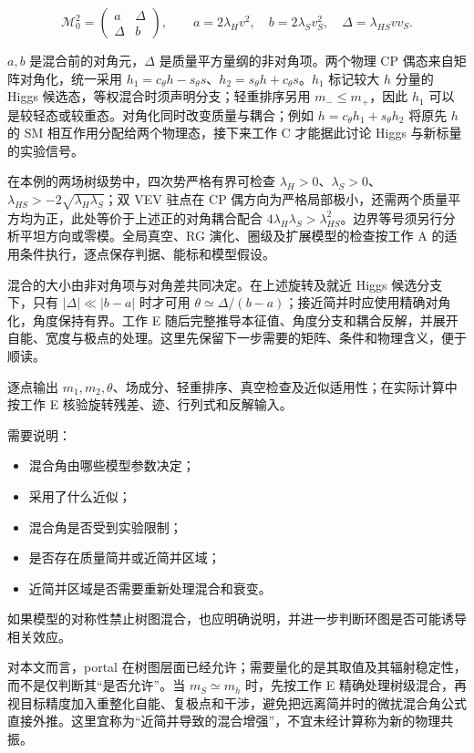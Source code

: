 \documentclass[
  chinese,
  UTF8]{ctexart}
\providecommand{\tightlist}{%
  \setlength{\itemsep}{0pt}\setlength{\parskip}{0pt}}
\begin{document}
\[
\mathcal M_0^2=
\begin{pmatrix}a&\Delta\\\Delta&b\end{pmatrix},\qquad
a=2\lambda_Hv^2,\quad b=2\lambda_Sv_S^2,\quad
\Delta=\lambda_{HS}vv_S.
\]

\(a,b\) 是混合前的对角元，\(\Delta\) 是质量平方量纲的非对角项。两个物理
CP 偶态来自矩阵对角化，统一采用
\(h_1=c_\theta h-s_\theta s\)、\(h_2=s_\theta h+c_\theta s\)。\(h_1\)
标记较大 \(h\) 分量的 Higgs 候选态，等权混合时须声明分支；轻重排序另用
\(m_-\le m_+\)，因此 \(h_1\)
可以是较轻态或较重态。对角化同时改变质量与耦合；例如
\(h=c_\theta h_1+s_\theta h_2\) 将原先 \(h\) 的 SM
相互作用分配给两个物理态，接下来工作 C 才能据此讨论 Higgs
与新标量的实验信号。

在本例的两场树级势中，四次势严格有界可检查
\(\lambda_H>0\)、\(\lambda_S>0\)、\(\lambda_{HS}>-2\sqrt{\lambda_H\lambda_S}\)；双
VEV 驻点在 CP
偶方向为严格局部极小，还需两个质量平方均为正，此处等价于上述正的对角耦合配合
\(4\lambda_H\lambda_S>\lambda_{HS}^2\)。边界等号须另行分析平坦方向或零模。全局真空、RG
演化、圈级及扩展模型的检查按工作 A
的适用条件执行，逐点保存判据、能标和模型假设。

混合的大小由非对角项与对角差共同决定。在上述旋转及就近 Higgs
候选分支下，只有 \(|\Delta|\ll|b-a|\) 时才可用
\(\theta\simeq\Delta/(b-a)\)；接近简并时应使用精确对角化，角度保持有界。工作
E
随后完整推导本征值、角度分支和耦合反解，并展开自能、宽度与极点的处理。这里先保留下一步需要的矩阵、条件和物理含义，便于顺读。

逐点输出
\(m_1,m_2,\theta\)、场成分、轻重排序、真空检查及近似适用性；在实际计算中按工作
E 核验旋转残差、迹、行列式和反解输入。

需要说明：

\begin{itemize}
\tightlist
\item
  混合角由哪些模型参数决定；
\item
  采用了什么近似；
\item
  混合角是否受到实验限制；
\item
  是否存在质量简并或近简并区域；
\item
  近简并区域是否需要重新处理混合和衰变。
\end{itemize}

如果模型的对称性禁止树图混合，也应明确说明，并进一步判断环图是否可能诱导相关效应。

对本文而言，portal
在树图层面已经允许；需要量化的是其取值及其辐射稳定性，而不是仅判断其``是否允许''。当
\(m_S\simeq m_h\) 时，先按工作 E
精确处理树级混合，再视目标精度加入重整化自能、复极点和干涉，避免把远离简并时的微扰混合角公式直接外推。这里宜称为``近简并导致的混合增强''，不宜未经计算称为新的物理共振。
\end{document}
